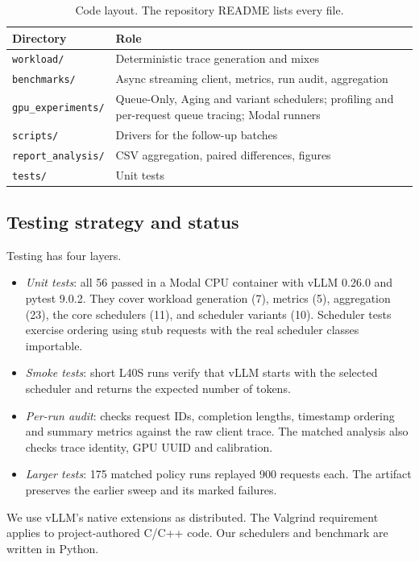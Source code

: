 \documentclass[sigplan,nonacm]{acmart}
\newcommand{\TESTN}{56}
\begin{document}
\begin{table}[t]
\caption{Code layout. The repository README lists every file.}
\label{tab:components}
\small
\begin{tabular}{@{}p{}p{}@{}}
\toprule
Directory & Role \\
\midrule
\texttt{workload/} & Deterministic trace generation and mixes \\
\texttt{benchmarks/} & Async streaming client, metrics, run audit, aggregation \\
\texttt{gpu\_experiments/} & Queue-Only, Aging and variant schedulers; profiling and
per-request queue tracing; Modal runners \\
\texttt{scripts/} & Drivers for the follow-up batches \\
\texttt{report\_analysis/} & CSV aggregation, paired differences, figures \\
\texttt{tests/} & Unit tests \\
\bottomrule
\end{tabular}
\end{table}


\subsection{Testing strategy and status}
Testing has four layers.
\begin{itemize}\setlength\itemsep{0pt}\setlength\parskip{0pt}
\item \emph{Unit tests}: all \TESTN{} passed in a Modal CPU container
with vLLM 0.26.0 and pytest 9.0.2. They cover workload generation (7),
metrics (5), aggregation (23), the core schedulers (11), and scheduler
variants (10). Scheduler tests exercise ordering using stub requests
with the real scheduler classes importable.
\item \emph{Smoke tests}: short L40S runs verify that vLLM starts with
the selected scheduler and returns the expected number of tokens.
\item \emph{Per-run audit}: checks request IDs, completion lengths,
timestamp ordering and summary metrics against the raw client trace.
The matched analysis also checks trace identity, GPU UUID and calibration.
\item \emph{Larger tests}: 175 matched policy runs replayed 900 requests
each. The artifact preserves the earlier sweep and its marked failures.
\end{itemize}
We use vLLM's native extensions as distributed. The Valgrind requirement
applies to project-authored C/C++ code. Our schedulers and benchmark are
written in Python.
\end{document}
